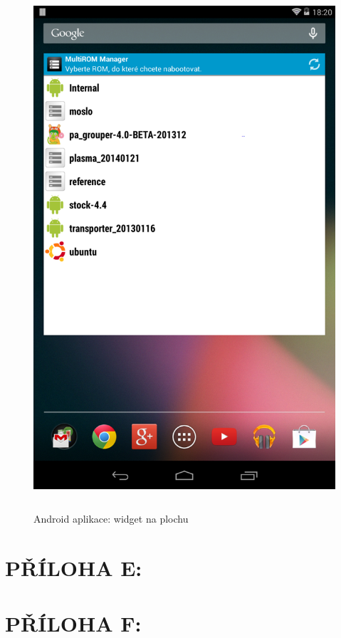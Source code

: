 \documentclass[12pt, a4paper, oneside]{article}
\begin{document}
\begin{figure}[H]
\begin{center}
 \includegraphics[height=550pt]{img/app_widget.png}
\caption{Android aplikace: widget na plochu}
\end{center}
\end{figure}

\newpage
\section*{PŘÍLOHA E:}
\printbibliography

\newpage
\section*{PŘÍLOHA F:}
~
\listoffigures   %
\end{document}
